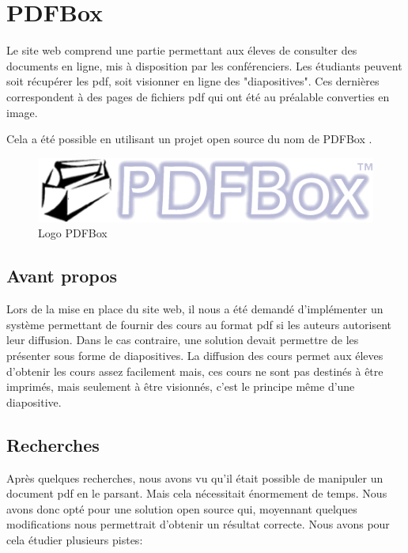 \chapter{PDFBox}

Le site web comprend une partie permettant aux éleves de consulter des documents
en ligne, mis à disposition par les conférenciers.
Les étudiants peuvent soit récupérer les pdf, soit visionner en ligne des "diapositives".
Ces dernières correspondent à des pages de fichiers pdf qui ont été au préalable converties en image. 

Cela a été possible en utilisant un projet open source du nom de PDFBox \cite{pdfbox}.

    \begin{figure}[h]
        \begin{center}
            \includegraphics[scale=0.6]{PDFBox.png} 
        \end{center}

        \caption{Logo PDFBox}
        \label{Logo PDFBox}
    \end{figure}

    \section{Avant propos}

Lors de la mise en place du site web, il nous a été demandé d'implémenter un 
système permettant de fournir des cours au format pdf si les auteurs autorisent
leur diffusion. Dans le cas contraire, une solution devait permettre de les présenter sous forme de diapositives.
La diffusion des cours permet aux éleves d'obtenir les cours assez facilement mais,
ces cours ne sont pas destinés à être imprimés, mais seulement à être visionnés,
c'est le principe même d'une diapositive.
    
   \section{Recherches}

Après quelques recherches, nous avons vu qu'il était 
possible de manipuler un document pdf en le parsant. Mais cela nécessitait 
énormement de temps. Nous avons donc opté pour une solution open source
qui, moyennant quelques modifications nous permettrait d'obtenir un résultat
correcte.
Nous avons pour cela étudier plusieurs pistes:

